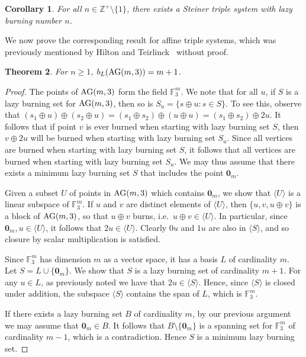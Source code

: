 \documentclass[12pt]{article}
\DeclareMathOperator{\AG}{\rm AG}
\newtheorem{theorem}{Theorem}[section]
\newtheorem{corollary}[theorem]{Corollary}
\theoremstyle{definition}
\numberwithin{table}{section}
\begin{document}
\begin{corollary}
\label{arbitrary_lazy_num}
For all $n\in\mathbb{Z}^+\setminus\{1\}$, there exists a Steiner triple system with lazy burning number $n$.
\end{corollary}

We now prove the corresponding result for affine triple systems, which was previously mentioned by Hilton and Teirlinck~\cite{HiltonTeirlinck1980} without proof.   
\begin{theorem}
\label{thm:affi_lazy_solved}
For $n\geq 1$, $b_L(\AG(m,3))=m+1$.
\end{theorem}
\begin{proof}
The points of $\AG(m,3)$ form the field $\mathbb{F}_3^m$. 
We note that for all $u$, if $S$ is a lazy burning set for $\AG(m,3)$, then so is $S_u=\{ s \oplus u : s\in S \}$. 
To see this, observe that $(s_1\oplus u) \oplus (s_2 \oplus u) = (s_1\oplus s_2)\oplus (u\oplus u) = (s_1 \oplus s_2) \oplus 2u$. 
It follows that if point $v$ is ever burned when starting with lazy burning set $S$, then $v\oplus 2u$ will be burned when starting with lazy burning set $S_u$. 
Since all vertices are burned when starting with lazy burning set $S$, it follows that all vertices are burned when starting with lazy burning set $S_u$. 
We may thus assume that there exists a minimum lazy burning set $S$ that includes the point $\mathbf{0}_m$. 

Given a subset $U$ of points in $\AG(m,3)$ which contains $\mathbf{0}_m$, we show that $\langle U \rangle$ is a linear subspace of $\mathbb{F}_3^m$.  If $u$ and $v$ are distinct elements of $\langle U\rangle$, then $\{u,v,u\oplus v\}$ is a block of $\AG(m,3)$, so that $u \oplus v$ burns, i.e.\ $u \oplus v \in \langle U \rangle$.  In particular, since $\mathbf{0}_m, u \in \langle U \rangle$, it follows that $2u\in\langle U\rangle$.  Clearly $0u$ and $1u$ are also in $\langle S\rangle$, and so closure by scalar multiplication is satisfied. 

Since $\mathbb{F}_3^m$ has dimension $m$ as a vector space, it has a basis $L$ of cardinality $m$.  Let $S=L \cup \{\mathbf{0}_m\}$.  We show that $S$ is a lazy burning set of cardinality $m+1$.  For any $u \in L$, as previously noted we have that $2u \in \langle S \rangle$.  Hence, since $\langle S \rangle$ is closed under addition, the subspace $\langle S \rangle$ contains the span of $L$, which is $\mathbb{F}_3^m$. 

If there exists a lazy burning set $B$ of cardinality $m$, by our previous argument we may assume that $\mathbf{0}_m \in B$.  It follows that $B \setminus \{\mathbf{0}_m\}$ is a spanning set for $\mathbb{F}_3^m$ of cardinality $m-1$, which is a contradiction.  Hence $S$ is a minimum lazy burning set.
\end{proof}
\end{document}

